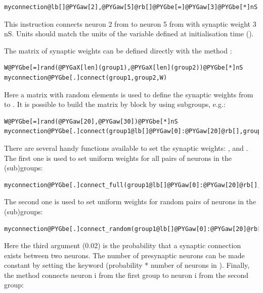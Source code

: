 \documentclass[letterpaper,10pt]{manual}
\begin{document}
\begin{Verbatim}[commandchars=@\[\]]
myconnection@lb[]@PYGaw[2],@PYGaw[5]@rb[]@PYGbe[=]@PYGaw[3]@PYGbe[*]nS
\end{Verbatim}

This instruction connects neuron 2 from  to neuron 5 from  with synaptic weight
3 nS. Units should match the units of the variable defined at initialisation time ().

The matrix of synaptic weights can be defined directly with the method :

\begin{Verbatim}[commandchars=@\[\]]
W@PYGbe[=]rand(@PYGaX[len](group1),@PYGaX[len](group2))@PYGbe[*]nS
myconnection@PYGbe[.]connect(group1,group2,W)
\end{Verbatim}

Here a matrix with random elements is used to define the synaptic weights from 
to . It is possible to build the matrix by block by using subgroups, e.g.:

\begin{Verbatim}[commandchars=@\[\]]
W@PYGbe[=]rand(@PYGaw[20],@PYGaw[30])@PYGbe[*]nS
myconnection@PYGbe[.]connect(group1@lb[]@PYGaw[0]:@PYGaw[20]@rb[],group2@lb[]@PYGaw[10]:@PYGaw[40]@rb[],W)
\end{Verbatim}

There are several handy functions available to set the synaptic weights:
,  and
. The first one
is used to set uniform weights for all pairs of neurons in the (sub)groups:

\begin{Verbatim}[commandchars=@\[\]]
myconnection@PYGbe[.]connect_full(group1@lb[]@PYGaw[0]:@PYGaw[20]@rb[],group2@lb[]@PYGaw[10]:@PYGaw[40]@rb[],weight@PYGbe[=]@PYGaw[5]@PYGbe[*]nS)
\end{Verbatim}

The second one is used to set uniform weights for random pairs of neurons in the (sub)groups:

\begin{Verbatim}[commandchars=@\[\]]
myconnection@PYGbe[.]connect_random(group1@lb[]@PYGaw[0]:@PYGaw[20]@rb[],group2@lb[]@PYGaw[10]:@PYGaw[40]@rb[],@PYGaw[0.02],weight@PYGbe[=]@PYGaw[5]@PYGbe[*]nS)
\end{Verbatim}

Here the third argument (0.02) is the probability that a synaptic connection exists between two neurons.
The number of presynaptic neurons can be made constant by setting the keyword 
(probability * number of neurons in ).
Finally, the method  connects neuron i from the first
group to neuron i from the second group:
\end{document}
